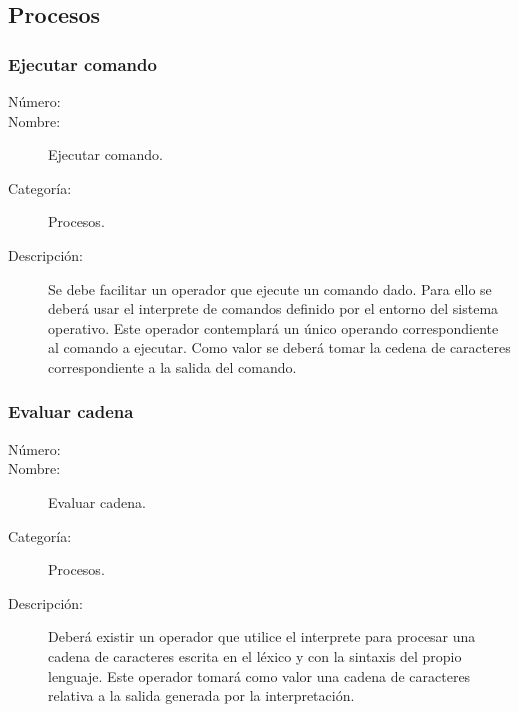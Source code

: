 \subsection{Procesos}

\subsubsection{Ejecutar comando}
\begin{framed}
	\begin{description}
		\item [Número:] \cn
		\item [Nombre:] Ejecutar comando.
		\item [Categoría:] Procesos.
		\item [Descripción:] Se debe facilitar un operador que ejecute un comando dado. 
		Para ello se deberá usar el interprete de comandos definido por el entorno del sistema operativo. Este operador contemplará
		un único operando correspondiente al comando a ejecutar. Como valor se deberá tomar la cedena de caracteres correspondiente 
		a la salida del comando.
	\end{description}
\end{framed}

\subsubsection{Evaluar cadena}
\begin{framed}
	\begin{description}
		\item [Número:] \cn
		\item [Nombre:] Evaluar cadena.
		\item [Categoría:] Procesos.
		\item [Descripción:] Deberá existir un operador que utilice el interprete para procesar una cadena de caracteres escrita en 
		el léxico y con la sintaxis del propio lenguaje. Este operador tomará como valor una cadena de caracteres relativa a la salida 
		generada por la interpretación.
	\end{description}
\end{framed}

